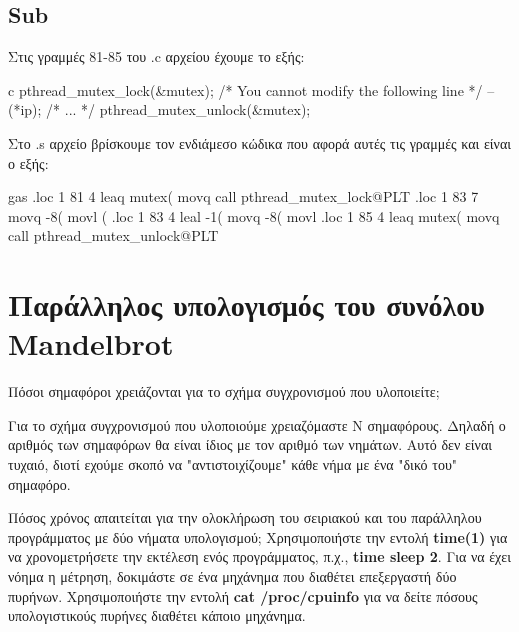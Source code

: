 \documentclass[12pt]{article}
\begin{document}
\pagebreak

\subsection*{Sub}

Στις γραμμές 81-85 του .c αρχείου έχουμε το εξής:
\begin{codeless}{c}
	pthread_mutex_lock(&mutex);
	/* You cannot modify the following line */
	--(*ip);
	/* ... */
	pthread_mutex_unlock(&mutex);
\end{codeless}

Στο .s αρχείο βρίσκουμε τον ενδιάμεσο κώδικα που αφορά αυτές τις γραμμές
και είναι ο εξής:
\begin{codeless}{gas}
    .loc 1 81 4
    leaq	mutex(%
    movq	%
    call	pthread_mutex_lock@PLT
    .loc 1 83 7
    movq	-8(%
    movl	(%
    .loc 1 83 4
    leal	-1(%
    movq	-8(%
    movl	%
    .loc 1 85 4
    leaq	mutex(%
    movq	%
    call	pthread_mutex_unlock@PLT
\end{codeless}

\pagebreak

\section{Παράλληλος υπολογισμός του συνόλου Mandelbrot}

\begin{question}
Πόσοι σημαφόροι χρειάζονται για το σχήμα συγχρονισμού που υλοποιείτε;
\end{question}

Για το σχήμα συγχρονισμού που υλοποιούμε χρειαζόμαστε Ν σημαφόρους.
Δηλαδή ο αριθμός των σημαφόρων θα είναι ίδιος με τον αριθμό των νημάτων.
Αυτό δεν είναι τυχαιό, διοτί εχούμε σκοπό να "αντιστοιχίζουμε" κάθε νήμα με
ένα "δικό του" σημαφόρο.

\begin{question}
Πόσος χρόνος απαιτείται για την ολοκλήρωση του σειριακού και του 
παράλληλου προγράμματος με δύο νήματα υπολογισμού; Χρησιμοποιήστε
την εντολή \textbf{time(1)} για να χρονομετρήσετε την εκτέλεση ενός προγράμματος, 
π.χ., \textbf{time sleep 2}. Για να έχει νόημα η μέτρηση, δοκιμάστε σε
ένα μηχάνημα που διαθέτει επεξεργαστή δύο πυρήνων. Xρησιμοποιήστε
την εντολή \textbf{cat /proc/cpuinfo} για να δείτε πόσους υπολογιστικούς
πυρήνες διαθέτει κάποιο μηχάνημα.
\end{question}
\end{document}
